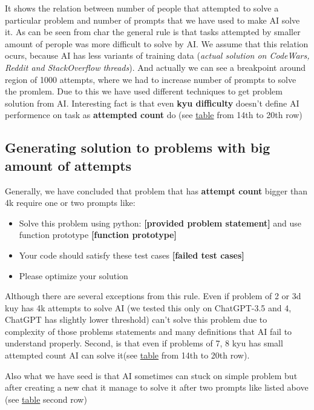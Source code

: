 \documentclass[12pt]{report}
\begin{document}
	It shows the relation between number of people that attempted to solve a particular problem and number of prompts that we have used to make AI solve it. As can be seen from char the general rule is that tasks attempted by smaller amount of perople was more difficult to solve by AI. We assume that this relation ocurs, because AI has less variants of training data (\textit{actual solution on CodeWars, Reddit and StackOverflow threads}). And actually we can see a breakpoint around region of 1000 attempts, where we had to increase number of prompts to solve the promlem. Due to this we have used different techniques to get problem solution from AI. Interesting fact is that even \textbf{kyu difficulty} doesn't define AI performence on task as \textbf{attempted count} do (see  \href{https://docs.google.com/spreadsheets/d/1qXPyAJsOOpmtxIoGqObwG5mTaLU3IWO0SQRGbjZPhEc/edit#gid=0}{table} from 14th to 20th row)
	
	\subsection{Generating solution to problems with big amount of attempts}
		
		Generally, we have concluded that problem that has \textbf{attempt count} bigger than 4k require one or two prompts like:
		
		\begin{itemize}
			\itemsep0em
			\item Solve this problem using python: \textbf{[provided problem statement]} and use function prototype \textbf{[function prototype]}
		   \item Your code should satisfy these test cases \textbf{[failed test cases]}
		   \item Please optimize your solution
		\end{itemize}
		
		Although there are several exceptions from this rule. Even if problem of 2 or 3d kuy has 4k attempts to solve AI (we tested this only on ChatGPT-3.5 and 4, ChatGPT has slightly lower threshold) can't solve this problem due to complexity of those problems statements and many definitions that AI fail to understand properly. Second, is that even if problems of 7, 8 kyu has small attempted count AI can solve it(see   \href{https://docs.google.com/spreadsheets/d/1qXPyAJsOOpmtxIoGqObwG5mTaLU3IWO0SQRGbjZPhEc/edit#gid=0}{table} from 14th to 20th row). 
		
		Also what we have seed is that AI sometimes can stuck on simple problem but after creating a new chat it manage to solve it after two prompts like listed above (see \href{https://docs.google.com/spreadsheets/d/1qXPyAJsOOpmtxIoGqObwG5mTaLU3IWO0SQRGbjZPhEc/edit#gid=0}{table} second row)
	
\end{document}
